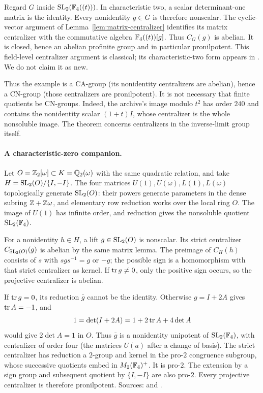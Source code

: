 Regard \(G\) inside \(\operatorname{SL}_2(\mathbb F_4((t)))\). In characteristic
two, a scalar determinant-one matrix is the identity.
Every nonidentity \(g\in G\) is therefore nonscalar.
The cyclic-vector argument of Lemma~\ref{lem:matrix-centralizer}
identifies its matrix centralizer with the commutative algebra
\(\mathbb F_4((t))[g]\). Thus \(C_G(g)\) is abelian.
It is closed, hence an abelian profinite group and in
particular pronilpotent. This field-level centralizer
argument is classical; its characteristic-two form appears
in \cite{fine-ct}. We do not claim it as new.

Thus the example is a CA-group (its nonidentity centralizers are
abelian), hence a CN-group (those centralizers are pronilpotent).
It is not necessary that finite quotients be CN-groups.
Indeed, the archive's image modulo \(t^2\) has order \(240\)
and contains the nonidentity scalar \((1+t)I\), whose
centralizer is the whole nonsoluble image. The theorem
concerns centralizers in the inverse-limit group itself.

\paragraph{A characteristic-zero companion.}
Let \(O=\mathbb Z_2[\omega]\subset K=\mathbb Q_2(\omega)\) with the same
quadratic relation, and take
\(H=\operatorname{SL}_2(O)/\{I,-I\}\).
The four matrices \(U(1),U(\omega),L(1),L(\omega)\)
topologically generate \(\operatorname{SL}_2(O)\): their powers generate
parameters in the dense subring \(\mathbb Z+\mathbb Z\omega\), and
elementary row reduction works over the local ring \(O\).
The image of \(U(1)\) has infinite order, and reduction
gives the nonsoluble quotient \(\operatorname{SL}_2(\mathbb F_4)\).

For a nonidentity \(h\in H\), a lift \(g\in\operatorname{SL}_2(O)\)
is nonscalar. Its strict centralizer \(C_{\operatorname{SL}_2(O)}(g)\)
is abelian by the same matrix lemma. The preimage of
\(C_H(h)\) consists of \(s\) with \(sgs^{-1}=g\) or \(-g\);
the possible sign is a homomorphism with that strict
centralizer as kernel. If \(\operatorname{tr} g\ne0\), only the
positive sign occurs, so the projective centralizer is
abelian.

If \(\operatorname{tr} g=0\), its reduction \(\bar g\) cannot be the
identity. Otherwise \(g=I+2A\) gives \(\operatorname{tr} A=-1\), and
\[
 1=\det(I+2A)=1+2\operatorname{tr} A+4\det A
\]
would give \(2\det A=1\) in \(O\).
Thus \(\bar g\) is a nonidentity unipotent of
\(\operatorname{SL}_2(\mathbb F_4)\), with centralizer of order four
(the matrices \(U(a)\) after a change of basis).
The strict centralizer has reduction a \(2\)-group and
kernel in the pro-\(2\) congruence subgroup, whose
successive quotients embed in \(M_2(\mathbb F_4)^+\).
It is pro-\(2\). The extension by a sign group and
subsequent quotient by \(\{I,-I\}\) are also pro-\(2\).
Every projective centralizer is therefore pronilpotent.
Sources:  and
.

